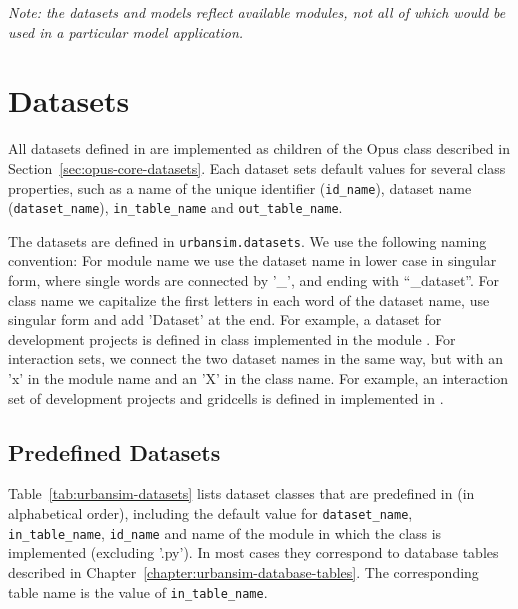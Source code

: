 \emph{Note: the datasets and models reflect available modules, not all of which would be used in a
particular model application.}

\section{Datasets}
\label{sec:urbansim-datasets}
 
%
All datasets defined in  are implemented as children of the
Opus  class  described in
Section~\ref{sec:opus-core-datasets}. Each dataset sets default values for several
class properties, such as a name of the unique identifier (\verb|id_name|),
dataset name (\verb|dataset_name|), \verb|in_table_name| and
\verb|out_table_name|. 

The  datasets are defined in \verb|urbansim.datasets|. 
We use the following naming convention: For module name we use the dataset 
name in lower case in singular form, where single words are connected by
'_', and ending with ``_dataset''.
For class name we capitalize the first letters in each word of the dataset 
name, use singular form and add 'Dataset' at the end. For example, a dataset for
development projects is defined in class 
implemented in the module . For interaction
sets, we connect the two dataset names in the same way, but with 
an 'x' in the module name and an 'X' in the class name. For example, an
interaction set of development projects and gridcells is defined in
 implemented in
.

\subsection{Predefined Datasets}
 
%
Table~\ref{tab:urbansim-datasets} lists dataset classes that are predefined in
 (in alphabetical order), including the default value for
\verb|dataset_name|, \verb|in_table_name|, \verb|id_name| and name of the
module in which the class is implemented (excluding '.py'). In most cases they
correspond to database tables described in
Chapter~\ref{chapter:urbansim-database-tables}. The corresponding table name
is the value of \verb|in_table_name|.

